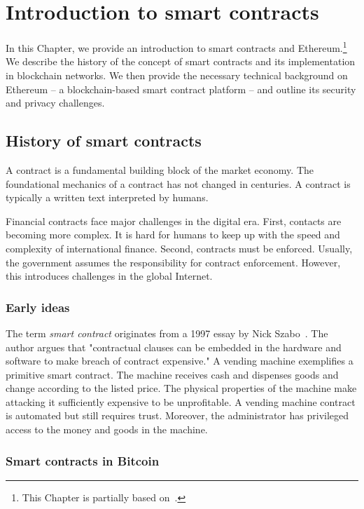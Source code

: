 \chapter{Introduction to smart contracts}

\label{Chapter09Introcontracts}

In this Chapter, we provide an introduction to smart contracts and Ethereum.\footnote{This Chapter is partially based on~\cite{Tikhomirov2017}.}
We describe the history of the concept of smart contracts and its implementation in blockchain networks.
We then provide the necessary technical background on Ethereum -- a blockchain-based smart contract platform -- and outline its security and privacy challenges.

\section{History of smart contracts}

A contract is a fundamental building block of the market economy.
The foundational mechanics of a contract has not changed in centuries.
A contract is typically a written text interpreted by humans.

Financial contracts face major challenges in the digital era.
First, contacts are becoming more complex.
It is hard for humans to keep up with the speed and complexity of international finance.
Second, contracts must be enforced.
Usually, the government assumes the responsibility for contract enforcement.
However, this introduces challenges in the global Internet.


\subsection{Early ideas}

The term \textit{smart contract} originates from a 1997 essay by Nick Szabo~\cite{Szabo1997}.
The author argues that "contractual clauses \textelp{} can be embedded in the hardware and software \textelp{} to make breach of contract expensive."
A vending machine exemplifies a primitive smart contract.
The machine receives cash and dispenses goods and change according to the listed price.
The physical properties of the machine make attacking it sufficiently expensive to be unprofitable.
A vending machine contract is automated but still requires trust.
Moreover, the administrator has privileged access to the money and goods in the machine.


\subsection{Smart contracts in Bitcoin}

